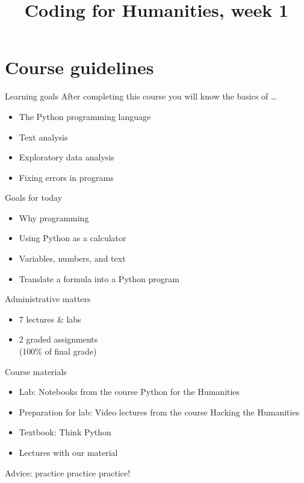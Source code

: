 \documentclass{beamer}
\title{Coding for Humanities, week 1}
\begin{document}
\begin{frame}
 \titlepage
\end{frame}

\begin{frame}
 \tableofcontents
\end{frame}


\section{Course guidelines}
\frame{\tableofcontents[currentsection]}

\begin{frame}{Learning goals}
   After completing this course you will know the basics of \dots
   \begin{itemize}
       \item The Python programming language
       \item Text analysis
       \item Exploratory data analysis
       \item Fixing errors in programs
   \end{itemize}
\end{frame}

\begin{frame}{Goals for today}
    \begin{itemize}
        \item Why programming
        \item Using Python as a calculator
        \item Variables, numbers, and text
        \item Translate a formula into a Python program
    \end{itemize}
\end{frame}

\begin{frame}{Administrative matters}
    \begin{itemize}
        \item 7 lectures \& labs
        \item 2 graded assignments \\
            (100\% of final grade)
    \end{itemize}
\end{frame}

\begin{frame}{Course materials}
    \begin{itemize}
        \item Lab: Notebooks from the course Python for the Humanities
        \item Preparation for lab: Video lectures from the course Hacking the Humanities
		\item Textbook: Think Python
        \item Lectures with our material
    \end{itemize}

	\pause\vspace{1em}
	Advice: practice practice practice!
\end{frame}
\end{document}
